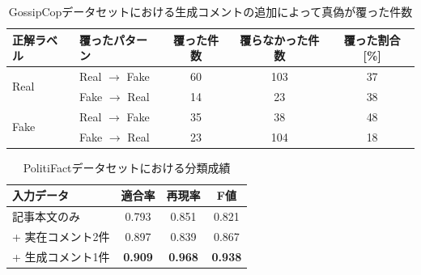 \begin{table}
    \caption{GossipCopデータセットにおける生成コメントの追加によって真偽が覆った件数}
    \label{tbl:reversed}
    \centering
    \begin{tabular}{llccc} \hline
        正解ラベル & 覆ったパターン & 覆った件数 & 覆らなかった件数 & 覆った割合[\%]\\ \hline
        \multirow{2}{*}{Real} & Real $\rightarrow$ Fake & 60 & 103 & 37\\
                              & Fake $\rightarrow$ Real & 14 & 23 & 38\\ \hline
        \multirow{2}{*}{Fake} & Real $\rightarrow$ Fake & 35 & 38 & 48\\
                              & Fake $\rightarrow$ Real & 23 & 104 & 18\\ \hline
    \end{tabular}
\end{table}

\begin{table}
    \renewcommand{\arraystretch}{1.3}
    \caption{PolitiFactデータセットにおける分類成績}
    \label{tbl:classify_results_pf}
    \centering
    \begin{tabular}{lccc}
        \hline
        入力データ           & 適合率 & 再現率 & F値 \\ \hline
        記事本文のみ         & 0.793     & 0.851  & 0.821  \\
        + 実在コメント2件  & 0.897 & 0.839 & 0.867 \\
        + 生成コメント1件 & \textbf{0.909}     & \textbf{0.968}  & \textbf{0.938}   \\ \hline
    \end{tabular}
\end{table}

